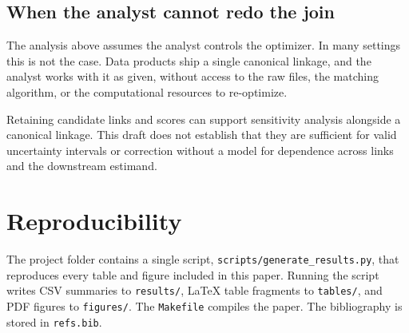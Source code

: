 \documentclass[11pt]{article}
\theoremstyle{remark}
\begin{document}
\subsection*{When the analyst cannot redo the join}

The analysis above assumes the analyst controls the optimizer. In many settings this is not the case. Data products ship a single canonical linkage, and the analyst works with it as given, without access to the raw files, the matching algorithm, or the computational resources to re-optimize.

Retaining candidate links and scores can support sensitivity analysis alongside a canonical linkage. This draft does not establish that they are sufficient for valid uncertainty intervals or correction without a model for dependence across links and the downstream estimand.

\section{Reproducibility}

The project folder contains a single script, \texttt{scripts/generate\_results.py}, that reproduces every table and figure included in this paper. Running the script writes CSV summaries to \texttt{results/}, \LaTeX{} table fragments to \texttt{tables/}, and PDF figures to \texttt{figures/}. The \texttt{Makefile} compiles the paper. The bibliography is stored in \texttt{refs.bib}.

\printbibliography
\end{document}
